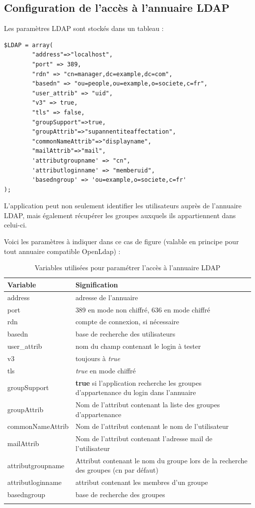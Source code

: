 \subsection{Configuration de l'accès à l'annuaire LDAP}

Les paramètres LDAP sont stockés dans un tableau :
\begin{lstlisting}
$LDAP = array(
		"address"=>"localhost",
		"port" => 389,
		"rdn" => "cn=manager,dc=example,dc=com",
		"basedn" => "ou=people,ou=example,o=societe,c=fr",
		"user_attrib" => "uid",
		"v3" => true,
		"tls" => false,
		"groupSupport"=>true,
		"groupAttrib"=>"supannentiteaffectation",
		"commonNameAttrib"=>"displayname",
		"mailAttrib"=>"mail",
		'attributgroupname' => "cn",
		'attributloginname' => "memberuid",
		'basedngroup' => 'ou=example,o=societe,c=fr'
);
\end{lstlisting}


L'application peut non seulement identifier les utilisateurs auprès de l'annuaire LDAP, mais également récupérer les groupes auxquels ils appartiennent dans celui-ci.

Voici les paramètres à indiquer dans ce cas de figure (valable en principe pour tout annuaire compatible OpenLdap) : 
\begin{longtable}{|p{4cm}|p{11cm}|}
\hline
\textbf{Variable} & \textbf{Signification} \\
\hline
\endhead
address &  adresse de l'annuaire\\
\hline
port & 389 en mode non chiffré, 636 en mode chiffré\\
\hline
rdn & compte de connexion, si nécessaire \\
\hline
basedn & base de recherche des utilisateurs\\
\hline
user\_attrib & nom du champ contenant le login à tester\\
\hline
v3 & toujours à \textit{true}\\
\hline
tls & \textit{true} en mode chiffré\\
\hline
groupSupport & \textbf{true} si l'application recherche les groupes d'appartenance du login dans l'annuaire\\
\hline
groupAttrib & Nom de l'attribut contenant la liste des groupes d'appartenance\\
\hline
commonNameAttrib & Nom de l'attribut contenant le nom de l'utilisateur\\
\hline
mailAttrib & Nom de l'attribut contenant l'adresse mail de l'utilisateur\\
\hline
attributgroupname & Attribut contenant le nom du groupe lors de la recherche des groupes (cn par défaut)\\
\hline
attributloginname & attribut contenant les membres d'un groupe\\
\hline
basedngroup & base de recherche des groupes \\
\hline
\caption{Variables utilisées pour paramétrer l'accès à l'annuaire LDAP}
\end{longtable}

